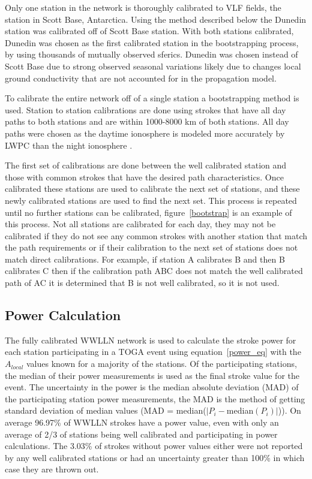 \documentclass[12pt]{article}
\begin{document}
Only one station in the network is thoroughly calibrated to VLF fields, the station in Scott Base, Antarctica. Using the method described below the Dunedin station was calibrated off of Scott Base station. With both stations calibrated, Dunedin was chosen as the first calibrated station in the bootstrapping process, by using thousands of mutually observed sferics. Dunedin was chosen instead of Scott Base due to strong observed seasonal variations likely due to changes local ground conductivity that are not accounted for in the propagation model.

To calibrate the entire network off of a single station a bootstrapping method is used. Station to station calibrations are done using strokes that have all day paths to both stations and are within 1000-8000 km of both stations. All day paths were chosen as the daytime ionosphere is modeled more accurately by LWPC than the night ionosphere \citep{McRae2000d}.

The first set of calibrations are done between the well calibrated station and those with common strokes that have the desired path characteristics. Once calibrated these stations are used to calibrate the next set of stations, and these newly calibrated stations are used to find the next set. This process is repeated until no further stations can be calibrated, figure~\ref{bootstrap} is an example of this process. Not all stations are calibrated for each day, they may not be calibrated if they do not see any common strokes with another station that match the path requirements or if their calibration to the next set of stations does not match direct calibrations. For example, if station A calibrates B and then B calibrates C then if the calibration path ABC does not match the well calibrated path of AC it is determined that B is not well calibrated, so it is not used.

\subsection{Power Calculation}

The fully calibrated WWLLN network is used to calculate the stroke power for each station participating in a TOGA event using equation~\ref{power_eq} with the $A_{local}$ values known for a majority of the stations. Of the participating stations, the median of their power measurements is used as the final stroke value for the event. The uncertainty in the power is the median absolute deviation (MAD) of the participating station power measurements, the MAD is the method of getting standard deviation of median values (MAD = median($|P_i - $median$(P_i)|$)). On average 96.97\% of WWLLN strokes have a power value, even with only an average of 2/3 of stations being well calibrated and participating in power calculations. The 3.03\% of strokes without power values either were not reported by any well calibrated stations or had an uncertainty greater than 100\% in which case they are thrown out.
\end{document}
